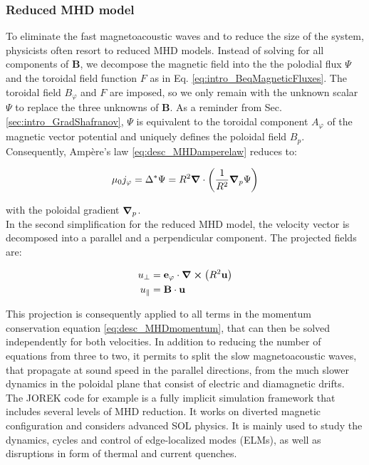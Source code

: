 \subsubsection{Reduced MHD model}
\label{ssec:desc_reducedMHD}
To eliminate the fast magnetoacoustic waves and to reduce the size of the system, physicists often resort to reduced MHD models. Instead of solving for all components of $\mathbf{B}$, we decompose the magnetic field into the the polodial flux $\Psi$ and the toroidal field function $F$ as in Eq. \ref{eq:intro_BeqMagneticFluxes}. The toroidal field $B_\varphi$ and $F$ are imposed, so we only remain with the unknown scalar $\Psi$ to replace the three unknowns of $\mathbf{B}$. As a reminder from Sec. \ref{sec:intro_GradShafranov}, $\Psi$ is equivalent to the toroidal component $A_\varphi$ of the magnetic vector potential and uniquely defines the poloidal field $B_p$. Consequently, Ampère's law \ref{eq:desc_MHDamperelaw} reduces to: 

\begin{equation}
	\mu_0 j_\varphi = \Delta^* \Psi = R^2\grad\cdot\left(\frac{1}{R^2}\grad_p\Psi\right)
\end{equation}

with the poloidal gradient $\grad_p$. \\

In the second simplification for the reduced MHD model, the velocity vector is decomposed into a parallel and a perpendicular component. The projected fields are:

\begin{align}
	u_\perp     &= \mathbf{e}_\varphi\cdot \grad\cross\left(R^2\mathbf{u}\right)  \\
	u_\parallel &= \mathbf{B}\cdot\mathbf{u} \\
\end{align}

This projection is consequently applied to all terms in the momentum conservation equation \ref{eq:desc_MHDmomentum}, that can then be solved independently for both velocities. In addition to reducing the number of equations from three to two, it permits to split the slow magnetoacoustic waves, that propagate at sound speed in the parallel directions, from the much slower dynamics in the poloidal plane that consist of electric and diamagnetic drifts. \\

The JOREK code\cite{huysmans2007mhd,hoelzl2021jorek} for example is a fully implicit simulation framework that includes several levels of MHD reduction. It works on diverted magnetic configuration and considers advanced SOL physics. It is mainly used to study the dynamics, cycles and control of edge-localized modes (ELMs), as well as disruptions in form of thermal and current quenches. 


